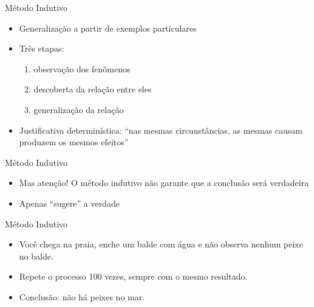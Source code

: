 \documentclass{beamer}
\begin{document}

\begin{frame}{Método Indutivo}
  \begin{itemize}
  \item \alert<1>{Generalização} a partir de exemplos particulares
  \item Três etapas:
    \begin{enumerate}
    \item observação dos fenômenos
    \item descoberta da relação entre eles
    \item generalização da relação
    \end{enumerate}
  \item Justificativa determinística: ``nas mesmas circunstâncias, as
    mesmas causam produzem os mesmos efeitos''
  \end{itemize}
\end{frame}


\begin{frame}{Método Indutivo}
  \begin{itemize}
  \item Mas atenção! O método indutivo não garante que a conclusão
    será verdadeira
  \item Apenas ``sugere'' a verdade
  \end{itemize}
\end{frame}

\begin{frame}{Método Indutivo}
  \begin{example}
    \begin{itemize}
    \item Você chega na praia, enche um balde com água e não observa
      nenhum peixe no balde.
    \item Repete o processo 100 vezes, sempre com o mesmo resultado.
    \item Conclusão: não há peixes no mar.
    \end{itemize}
  \end{example}
\end{frame}
\end{document}
